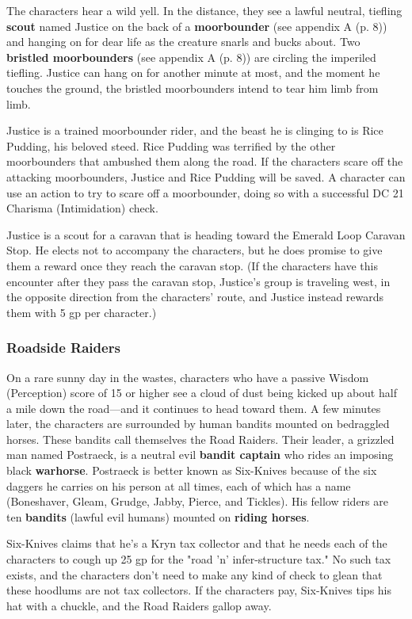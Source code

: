 \documentclass[a4paper, 11pt, bg=full, twocolumn, nooutline]{dndbook}
\begin{document}
The characters hear a wild yell. In the distance, they see a lawful neutral, tiefling \textbf{scout} named Justice on the back of a \textbf{moorbounder} (see appendix A (p. 8)) and hanging on for dear life as the creature snarls and bucks about. Two \textbf{bristled moorbounders} (see appendix A (p. 8)) are circling the imperiled tiefling. Justice can hang on for another minute at most, and the moment he touches the ground, the bristled moorbounders intend to tear him limb from limb.

Justice is a trained moorbounder rider, and the beast he is clinging to is Rice Pudding, his beloved steed. Rice Pudding was terrified by the other moorbounders that ambushed them along the road. If the characters scare off the attacking moorbounders, Justice and Rice Pudding will be saved. A character can use an action to try to scare off a moorbounder, doing so with a successful DC 21 Charisma (Intimidation) check.

Justice is a scout for a caravan that is heading toward the Emerald Loop Caravan Stop. He elects not to accompany the characters, but he does promise to give them a reward once they reach the caravan stop. (If the characters have this encounter after they pass the caravan stop, Justice's group is traveling west, in the opposite direction from the characters' route, and Justice instead rewards them with 5 gp per character.)

\subsubsection{Roadside Raiders}

On a rare sunny day in the wastes, characters who have a passive Wisdom (Perception) score of 15 or higher see a cloud of dust being kicked up about half a mile down the road---and it continues to head toward them. A few minutes later, the characters are surrounded by human bandits mounted on bedraggled horses. These bandits call themselves the Road Raiders. Their leader, a grizzled man named Postraeck, is a neutral evil \textbf{bandit captain} who rides an imposing black \textbf{warhorse}. Postraeck is better known as Six-Knives because of the six daggers he carries on his person at all times, each of which has a name (Boneshaver, Gleam, Grudge, Jabby, Pierce, and Tickles). His fellow riders are ten \textbf{bandits} (lawful evil humans) mounted on \textbf{riding horses}.

Six-Knives claims that he's a Kryn tax collector and that he needs each of the characters to cough up 25 gp for the "road 'n' infer-structure tax." No such tax exists, and the characters don't need to make any kind of check to glean that these hoodlums are not tax collectors. If the characters pay, Six-Knives tips his hat with a chuckle, and the Road Raiders gallop away.
\end{document}
